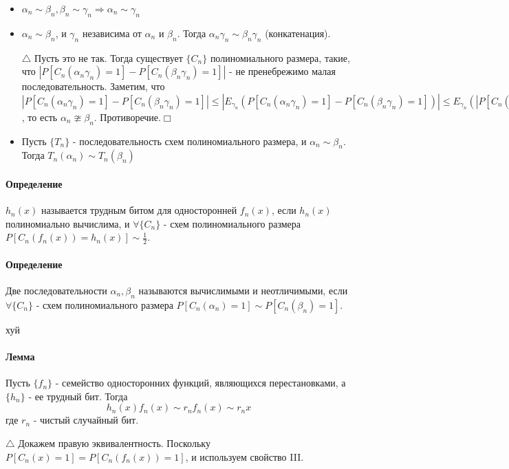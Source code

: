 \documentclass[12pt, a4paper]{article}
\begin{document}
\begin{itemize}
 \item[1)] $\alpha_n \sim \beta_n, \beta_n \sim \gamma_n \Rightarrow \alpha_n \sim \gamma_n$
 \item[2)] $\alpha_n \sim \beta_n$, и $\gamma_n$ независима от $\alpha_n$ и $\beta_n$. Тогда $\alpha_n\gamma_n \sim \beta_n\gamma_n$ (конкатенация).
 
 $\triangle$ Пусть это не так. Тогда существует $\{C_n\}$ полиномиального размера, такие, что $|P[C_n(\alpha_n\gamma_n)=1] - P[C_n(\beta_n\gamma_n)=1]|$ - не пренебрежимо малая последовательность. Заметим, что $|P[C_n(\alpha_n\gamma_n)=1] - P[C_n(\beta_n\gamma_n)=1]| \leq |E_{\gamma_n}(P[C_n(\alpha_n\gamma_n)=1] - P[C_n(\beta_n\gamma_n)=1])| \leq E_{\gamma_n}(|P[C_n(\alpha_n\gamma_n)=1] - P[C_n(\beta_n\gamma_n)=1]|) \leq |P[C_n(\alpha_n\gamma_{max})=1] - P[C_n(\beta_n\gamma_{max})=1])|$, то есть $\alpha_n \ncong \beta_n$. Противоречие.$\Box$
 \item[3)] Пусть $\{T_n\}$ - последовательность схем полиномиального размера, и $\alpha_n \sim \beta_n$. Тогда $T_n(\alpha_n) \sim T_n(\beta_n)$
\end{itemize}

\paragraph{Определение} $h_n(x)$ называется трудным битом для односторонней $f_n(x)$, если $h_n(x)$ полиномиально вычислима, и $\forall \{C_n\}$ - схем полиномиального размера $P[C_n(f_n(x))=h_n(x)] \sim \frac{1}{2}$.

\paragraph{Определение} Две последовательности $\alpha_n, \beta_n$ называются вычислимыми и неотличимыми, если $\forall \{C_n\}$ - схем полиномиального размера $P[C_n(\alpha_n)=1] \sim P[C_n(\beta_n)=1]$.

хуй

\paragraph{Лемма} Пусть $\{f_n\}$ - семейство односторонних функций, являющихся перестановками, а $\{h_n\}$ - ее трудный бит. Тогда
\[
 h_n(x)f_n(x) \sim r_n f_n(x) \sim r_n x
\]
где $r_n$ - чистый случайный бит.

$\triangle$ Докажем правую эквивалентность. Поскольку $P[C_n(x)=1]=P[C_n(f_n(x))=1]$, и используем свойство III.
\end{document}
